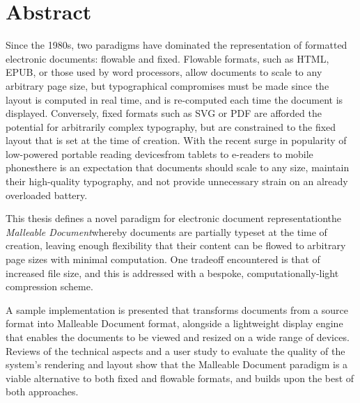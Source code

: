 \cleardoublepage
\begingroup
\let\clearpage\relax
\let\cleardoublepage\relax
\let\cleardoublepage\relax

\chapter*{Abstract}

Since the 1980s, two paradigms have dominated the representation of formatted electronic documents: flowable and fixed. Flowable formats, such as HTML, EPUB, or those used by word processors, allow documents to scale to any arbitrary page size, but typographical compromises must be made since the layout is computed in real time, and is re-computed each time the document is displayed. Conversely, fixed formats such as SVG or PDF are afforded the potential for arbitrarily complex typography, but are constrained to the fixed layout that is set at the time of creation. With the recent surge in popularity of low-powered portable reading devices\ed{}from tablets to e-readers to mobile phones\ed{}there is an expectation that documents should scale to any size, maintain their high-quality typography, and not provide unnecessary strain on an already overloaded battery.

This thesis defines a novel paradigm for electronic document representation\ed{}the \emph{Malleable Document}\ed{}whereby documents are partially typeset at the time of creation, leaving enough flexibility that their content can be flowed to arbitrary page sizes with minimal computation. One tradeoff encountered is that of increased file size, and this is addressed with a bespoke, computationally-light compression scheme.

A sample implementation is presented that transforms documents from a source format into Malleable Document format, alongside a lightweight display engine that enables the documents to be viewed and resized on a wide range of devices. Reviews of the technical aspects and a user study to evaluate the quality of the system's rendering and layout show that the Malleable Document paradigm is a viable alternative to both fixed and flowable formats, and builds upon the best of both approaches.


\endgroup

\vfill
